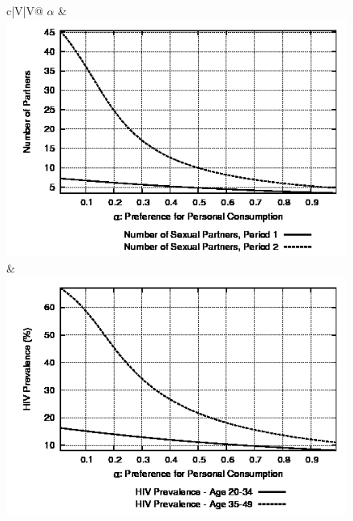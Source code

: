 \documentclass[12pt]{article}
\begin{document}
\begin{figure}
\begin{center}
\begin{tabular}{c|V|V@{}}
\textbf{$\alpha$} & \includegraphics[scale=0.39]{images/malpha.png} & \includegraphics[scale=0.39]{images/hivalpha.png} \\ \hline

\end{tabular}
\end{center}
\end{figure}
\end{document}
